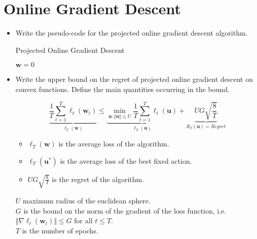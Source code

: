 \newpage
\section{Online Gradient Descent}

\begin{itemize}

    \item Write the pseudo-code for the projected online gradient descent algorithm. 

    \begin{algorithm}[H]
        \SetAlgoLined
        \DontPrintSemicolon
        \caption{Projected Online Gradient Descent}
        $\boldsymbol{w} = 0$\\
    \end{algorithm}

    \item Write the upper bound on the regret of projected online gradient descent on convex functions. Define the main quantities occurring in the bound.

        $$
        \underbrace{\frac{1}{T} \sum_{t=1}^{T} \ell_{t}(\boldsymbol{w}_{t})}_{\ell_T(\boldsymbol{w})} \leq \underbrace{\min_{\boldsymbol{u} : \Vert \boldsymbol{u} \Vert \leq U} \frac{1}{T} \sum_{t=1}^{T} \ell_{t}(\boldsymbol{u})}_{\ell_T(\boldsymbol{u})} + \underbrace{UG \sqrt{\frac{8}{T}}}_{R_T(\boldsymbol{u}) = Regret}
        $$

        \begin{itemize}
            \item $\ell_T(\boldsymbol{w})$ is the average loss of the algorithm.
            \item $\ell_T(\boldsymbol{u^*})$ is the average loss of the best fixed action.
            \item $UG \sqrt{\frac{8}{T}}$ is the regret of the algorithm.
        \end{itemize}
        
        $U$ maximum radius of the euclidean sphere.\\
        $G$ is the bound on the norm of the gradient of the loss function, i.e. $\Vert \nabla \ell_{t}(\boldsymbol{w}_{t}) \Vert \leq G$ for all $t \leq T$.\\
        $T$ is the number of epochs.\\


\end{itemize}
